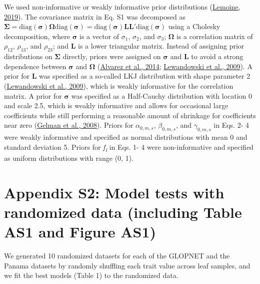 \documentclass[
  12pt,
  letterpaper,
  DIV=11,
  numbers=noendperiod]{scrartcl}
\begin{document}
We used non-informative or weakly informative prior distributions
(\protect\hyperlink{ref-Lemoine2019}{Lemoine, 2019}). The covariance
matrix in Eq. S1 was decomposed as
\({\mathbf \Sigma} = \mathrm {diag}(\mathbf {\sigma}){\mathbf \Omega}\mathrm {diag}({\mathbf \sigma}) = \mathrm {diag}({\mathbf \sigma}){\mathbf L}{\mathbf L}\prime \mathrm {diag}({\mathbf \sigma})\)
using a Cholesky decomposition, where \(\mathbf {\sigma}\) is a vector
of \(\sigma_{1}\), \(\sigma_{2}\), and \(\sigma_{3}\);
\({\mathbf \Omega}\) is a correlation matrix of \(\rho_{12}\),
\(\rho_{13}\), and \(\rho_{23}\); and \textbf{L} is a lower triangular
matrix. Instead of assigning prior distributions on
\(\boldsymbol{\Sigma}\) directly, priors were assigned on
\({\mathbf \sigma}\) and \textbf{L} to avoid a strong dependence between
\({\mathbf \sigma}\) and \({\mathbf \Omega}\)
(\protect\hyperlink{ref-Alvarez2014}{Alvarez et al., 2014};
\protect\hyperlink{ref-Lewandowski2009}{Lewandowski et al., 2009}). A
prior for \textbf{L} was specified as a so-called LKJ distribution with
shape parameter 2 (\protect\hyperlink{ref-Lewandowski2009}{Lewandowski
et al., 2009}), which is weakly informative for the correlation matrix.
A prior for \(\mathbf{\sigma}\) was specified as a Half-Cauchy
distribution with location 0 and scale 2.5, which is weakly informative
and allows for occasional large coefficients while still performing a
reasonable amount of shrinkage for coefficients near zero
(\protect\hyperlink{ref-Gelman2008}{Gelman et al., 2008}). Priors for
\(\alpha_{0,m,s}\), \(\beta_{0,m,s}\), and \(\gamma_{0,m,s}\) in Eqs. 2-
4 were weakly informative and specified as normal distributions with
mean 0 and standard deviation 5. Priors for \emph{f\textsubscript{i}} in
Eqs. 1- 4 were non-informative and specified as uniform distributions
with range (0, 1).

\newpage

\hypertarget{appendix-s2-model-tests-with-randomized-data-including-table-as1-and-figure-as1}{%
\section{Appendix S2: Model tests with randomized data (including Table
AS1 and Figure
AS1)}\label{appendix-s2-model-tests-with-randomized-data-including-table-as1-and-figure-as1}}

We generated 10 randomized datasets for each of the GLOPNET and the
Panama datasets by randomly shuffling each trait value across leaf
samples, and we fit the best models (Table 1) to the randomized data.
\end{document}
